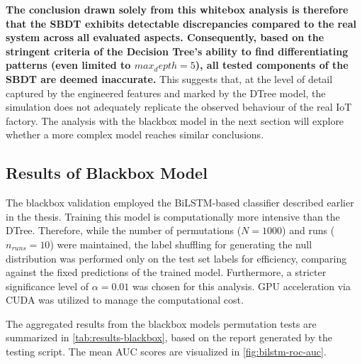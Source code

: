 \textbf{The conclusion drawn solely from this whitebox analysis is therefore that the SBDT exhibits detectable discrepancies compared to the real system across all evaluated aspects. Consequently, based on the stringent criteria of the Decision Tree's ability to find differentiating patterns (even limited to $max_depth=5$), all tested components of the SBDT are deemed inaccurate.} This suggests that, at the level of detail captured by the engineered features and marked by the DTree model, the simulation does not adequately replicate the observed behaviour of the real IoT factory. The analysis with the blackbox model in the next section will explore whether a more complex model reaches similar conclusions.

\subsection*{Results of Blackbox Model}

The blackbox validation employed the BiLSTM-based classifier described earlier in the thesis. Training this model is computationally more intensive than the DTree. Therefore, while the number of permutations ($N=1000$) and runs ($n_{runs}=10$) were maintained, the label shuffling for generating the null distribution was performed only on the test set labels for efficiency, comparing against the fixed predictions of the trained model. Furthermore, a stricter significance level of $\alpha = 0.01$ was chosen for this analysis. GPU acceleration via CUDA \autocite{NVIDIA_CUDA} was utilized to manage the computational cost.

The aggregated results from the blackbox models permutation tests are summarized in \autoref{tab:results-blackbox}, based on the report generated by the testing script. The mean AUC scores are visualized in \autoref{fig:bilstm-roc-auc}.


